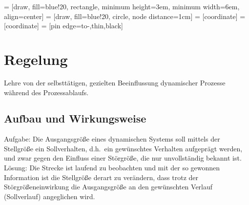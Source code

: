 

 = [draw, fill=blue!20, rectangle, 
    minimum height=3em, minimum width=6em, align=center]
 = [draw, fill=blue!20, circle, node distance=1cm]
 = [coordinate]
 = [coordinate]
 = [pin edge={to-,thin,black}]

\section{Regelung}
Lehre von der selbsttätigen, gezielten Beeinflussung dynamischer Prozesse während des Prozessablaufs.

\subsection{Aufbau und Wirkungsweise}
Aufgabe: Die Ausgangsgröße eines dynamischen Systems soll mittels der Stellgröße ein Sollverhalten, d.h.\ ein
gewünschtes Verhalten aufgeprägt werden, und zwar gegen den Einfluss einer Störgröße, die nur unvollständig bekannt
ist.\\

Lösung: Die Strecke ist laufend zu beobachten und mit der so gewonnen Information ist die Stellgröße derart zu
verändern, dass trotz der Störgrößeneinwirkung die Ausgangsgröße an den gewünschten Verlauf (Sollverlauf)
angeglichen wird.\\

